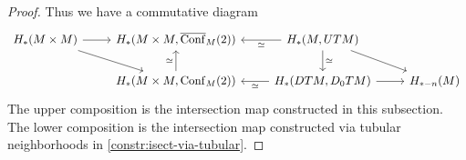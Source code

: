 \documentclass{scrartcl}
\theoremstyle{plain}
\theoremstyle{definition}
\newcommand{\capp}{\mathbin{\frown}}
\newcommand{\iso}{\cong}
\newcommand{\quiso}{\simeq}
\DeclareMathOperator{\id}{id}
\DeclareMathOperator{\Conf}{Conf}
\DeclareMathOperator{\cConf}{\overline{Conf}}
\begin{document}
\begin{proof}
    Thus we have a commutative diagram
    \[\begin{tikzcd}
        H_*(M\times M) \rar \ar[dr] & H_*(M\times M, \cConf_M(2)) & \dar["\quiso"] \lar["\quiso"] H_*(M, UTM) \ar[rd] &\\
        & H_*(M\times M, \Conf_M(2)) \uar["\quiso"] & \lar["\quiso"] H_*(DTM, D_0TM) \rar & H_{*-n}(M)
    \end{tikzcd}\]
    The upper composition is the intersection map constructed in this subsection. The lower composition is the intersection map constructed via tubular neighborhoods in \cref{constr:isect-via-tubular}.


    

    
    

\end{proof}
\end{document}
